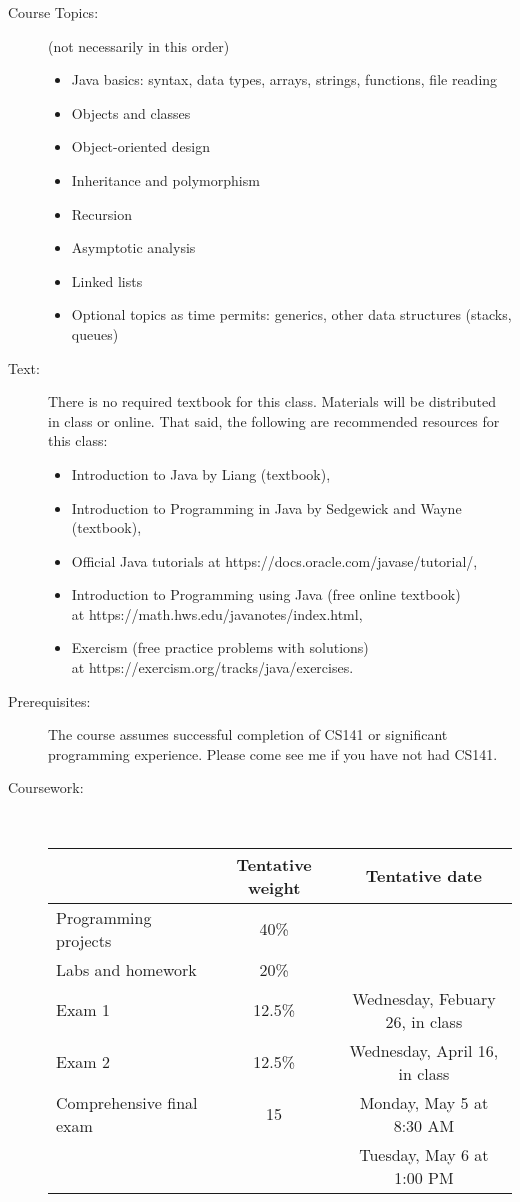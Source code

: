 \documentclass [letterpaper,11pt]{article}
\begin{document}
\begin{description}
\item[Course Topics:] (not necessarily in this order) 
\begin{itemize} \setlength{\itemsep}{0em}\setlength{\parskip}{0pt}
	\item Java basics: syntax, data types, arrays, strings, functions, file reading
	\item Objects and classes
	\item Object-oriented design
	\item Inheritance and polymorphism
	\item Recursion
	\item Asymptotic analysis
	\item Linked lists
	\item Optional topics as time permits: generics, other data structures (stacks, queues)
	\end{itemize}



\item[Text:]
   There is no required textbook for this class.  Materials will be distributed in class
   or online.  That said, the following are recommended resources for this class:

\begin{itemize} \setlength{\itemsep}{0em}\setlength{\parskip}{0pt}
	\item Introduction to Java by Liang (textbook),
	\item Introduction to Programming in Java by Sedgewick and Wayne (textbook),
	\item Official Java tutorials at https://docs.oracle.com/javase/tutorial/,
	\item Introduction to Programming using Java (free online textbook)\\
at https://math.hws.edu/javanotes/index.html,
	\item Exercism (free practice problems with solutions)\\at https://exercism.org/tracks/java/exercises.
	\end{itemize}

\item[Prerequisites:]
The course assumes successful completion of CS141 or significant programming experience.  Please come see me if you have not had CS141.

\item[Coursework:] \

\begin{tabular}{lcc} 
& Tentative weight & Tentative date \\ \hline
Programming projects & 40\% & \\
Labs and homework & 20\% & \\
Exam 1 & 12.5\% & Wednesday, Febuary 26, in class \\
Exam 2 & 12.5\% & Wednesday, April 16, in class\\
Comprehensive final exam & 15 & Monday, May 5 at 8:30 AM \\
&& Tuesday, May 6 at 1:00 PM%
\end{tabular}


\end{description}
\end{document}
